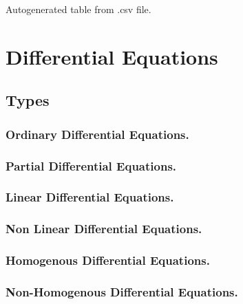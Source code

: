 \documentclass[12pt]{article}
\begin{document}
\begin{table}[h!]
	\begin{center}
		\caption{Autogenerated table from .csv file.}
		\label{table1}
\end{center}
\end{table}
	\newpage
	\section{Differential Equations}
	\subsection{Types}
	\subsubsection{Ordinary Differential Equations.}
	\subsubsection{Partial Differential Equations.}
	\subsubsection{Linear Differential Equations.}
	\subsubsection{Non Linear Differential Equations.}
	\subsubsection{Homogenous Differential Equations.}
	\subsubsection{Non-Homogenous Differential Equations.}
	
\end{document}
